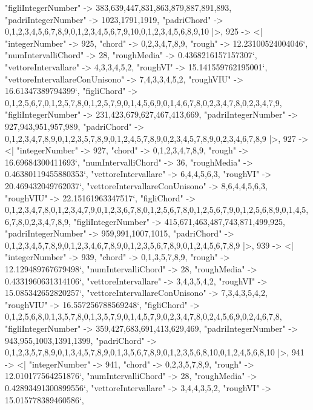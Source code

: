 \documentclass[
]{article}
\begin{document}
\begin{DatasetVerbatim}
    "figliIntegerNumber" -> {383,639,447,831,863,879,887,891,893},
    "padriIntegerNumber" -> {1023,1791,1919},
    "padriChord" -> {{0,1,2,3,4,5,6,7,8,9},{0,1,2,3,4,5,6,7,9,10},{0,1,2,3,4,5,6,8,9,10}}
  |>,
  925 -> <|
    "integerNumber" -> 925,
    "chord" -> {0,2,3,4,7,8,9},
    "rough" -> 12.23100524004046`,
    "numIntervalliChord" -> 28,
    "roughMedia" -> 0.4368216157157307`,
    "vettoreIntervallare" -> {4,3,3,4,5,2},
    "roughVI" -> 15.141559762195001`,
    "vettoreIntervallareConUnisono" -> {7,4,3,3,4,5,2},
    "roughVIU" -> 16.61347389794399`,
    "figliChord" -> {{0,1,2,5,6,7},{0,1,2,5,7,8},{0,1,2,5,7,9},{0,1,4,5,6,9},{0,1,4,6,7,8},{0,2,3,4,7,8},{0,2,3,4,7,9}},
    "figliIntegerNumber" -> {231,423,679,627,467,413,669},
    "padriIntegerNumber" -> {927,943,951,957,989},
    "padriChord" -> {{0,1,2,3,4,7,8,9},{0,1,2,3,5,7,8,9},{0,1,2,4,5,7,8,9},{0,2,3,4,5,7,8,9},{0,2,3,4,6,7,8,9}}
  |>,
  927 -> <|
    "integerNumber" -> 927,
    "chord" -> {0,1,2,3,4,7,8,9},
    "rough" -> 16.69684300411693`,
    "numIntervalliChord" -> 36,
    "roughMedia" -> 0.46380119455880353`,
    "vettoreIntervallare" -> {6,4,4,5,6,3},
    "roughVI" -> 20.469432049762037`,
    "vettoreIntervallareConUnisono" -> {8,6,4,4,5,6,3},
    "roughVIU" -> 22.15161963347517`,
    "figliChord" -> {{0,1,2,3,4,7,8},{0,1,2,3,4,7,9},{0,1,2,3,6,7,8},{0,1,2,5,6,7,8},{0,1,2,5,6,7,9},{0,1,2,5,6,8,9},{0,1,4,5,6,7,8},{0,2,3,4,7,8,9}},
    "figliIntegerNumber" -> {415,671,463,487,743,871,499,925},
    "padriIntegerNumber" -> {959,991,1007,1015},
    "padriChord" -> {{0,1,2,3,4,5,7,8,9},{0,1,2,3,4,6,7,8,9},{0,1,2,3,5,6,7,8,9},{0,1,2,4,5,6,7,8,9}}
  |>,
  939 -> <|
    "integerNumber" -> 939,
    "chord" -> {0,1,3,5,7,8,9},
    "rough" -> 12.129489767679498`,
    "numIntervalliChord" -> 28,
    "roughMedia" -> 0.4331960631314106`,
    "vettoreIntervallare" -> {3,4,3,5,4,2},
    "roughVI" -> 15.085342652820257`,
    "vettoreIntervallareConUnisono" -> {7,3,4,3,5,4,2},
    "roughVIU" -> 16.557256788569248`,
    "figliChord" -> {{0,1,2,5,6,8},{0,1,3,5,7,8},{0,1,3,5,7,9},{0,1,4,5,7,9},{0,2,3,4,7,8},{0,2,4,5,6,9},{0,2,4,6,7,8}},
    "figliIntegerNumber" -> {359,427,683,691,413,629,469},
    "padriIntegerNumber" -> {943,955,1003,1391,1399},
    "padriChord" -> {{0,1,2,3,5,7,8,9},{0,1,3,4,5,7,8,9},{0,1,3,5,6,7,8,9},{0,1,2,3,5,6,8,10},{0,1,2,4,5,6,8,10}}
  |>,
  941 -> <|
    "integerNumber" -> 941,
    "chord" -> {0,2,3,5,7,8,9},
    "rough" -> 12.010177564251876`,
    "numIntervalliChord" -> 28,
    "roughMedia" -> 0.42893491300899556`,
    "vettoreIntervallare" -> {3,4,4,3,5,2},
    "roughVI" -> 15.015778389460586`,

\end{DatasetVerbatim}
\end{document}
